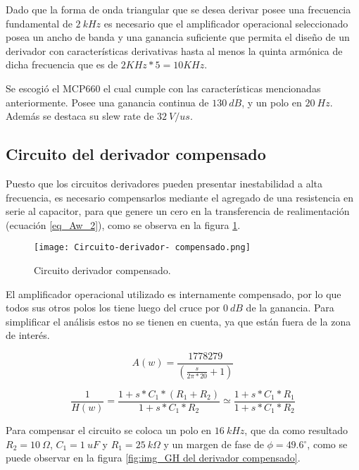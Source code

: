 Dado que la forma de onda triangular que se desea derivar posee una frecuencia fundamental de $2 \:kHz$ es necesario que el amplificador operacional seleccionado posea un ancho de banda y una ganancia suficiente que permita el diseño de un derivador con características derivativas hasta al menos la quinta armónica de dicha frecuencia que es de $2KHz*5=10 KHz$.

Se escogió el MCP660 el cual cumple con las características mencionadas anteriormente. Posee una ganancia continua de $130\:dB$, y un polo en $20\:Hz$. Además se destaca su slew rate de $32\:V/us$.

\subsection{Circuito del derivador compensado}

Puesto que los circuitos derivadores pueden presentar inestabilidad a alta frecuencia, es necesario compensarlos mediante el agregado de una resistencia en serie al capacitor, para que genere un cero en la transferencia de realimentación (ecuación \ref{eq_Aw_2}), como se observa en la figura  \ref{fig:img_Circuito_derivador_compensado}.

\begin{figure}[H]
	\centering
	\texttt{[image: Circuito-derivador- compensado.png]}
	\caption{Circuito derivador compensado.}
	\label{fig:img_Circuito_derivador_compensado}
\end{figure}

El amplificador operacional utilizado es internamente compensado, por lo que todos sus otros polos los tiene luego del cruce por $0\:dB$ de la ganancia. Para simplificar el análisis estos no se tienen en cuenta, ya que están fuera de la zona de interés.

\begin{equation} \label{eq_Aw_1}
	A(w)=\frac{1778279}{(\frac{s}{2\pi *20}+1)}
\end{equation} 

\begin{equation} \label{eq_Aw_2}
	\frac{1}{H(w)}=\frac{1+s*C_1*(R_1+R_2)}{1+s*C_1*R_2}\simeq \frac{1+s*C_1*R_1}{1+s*C_1*R_2}
\end{equation}

Para compensar el circuito se coloca un polo en $16 \:kHz$, que da como resultado $R_2=10\:\Omega$, $C_1=1\:uF$ y $R_1=25\: k\Omega$ y un margen de fase de $\phi =49.6{}^\circ $, como se puede observar en la figura \ref{fig:img_GH del derivador compensado}.

